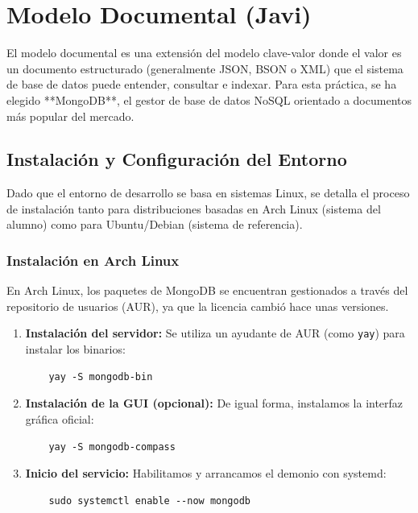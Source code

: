 \chapter{Modelo Documental (Javi)}

El modelo documental es una extensión del modelo clave-valor donde el valor es un documento estructurado (generalmente JSON, BSON o XML) que el sistema de base de datos puede entender, consultar e indexar. Para esta práctica, se ha elegido **MongoDB**, el gestor de base de datos NoSQL orientado a documentos más popular del mercado.

\section{Instalación y Configuración del Entorno}
Dado que el entorno de desarrollo se basa en sistemas Linux, se detalla el proceso de instalación tanto para distribuciones basadas en Arch Linux (sistema del alumno) como para Ubuntu/Debian (sistema de referencia).

\subsection{Instalación en Arch Linux}
En Arch Linux, los paquetes de MongoDB se encuentran gestionados a través del repositorio de usuarios (AUR), ya que la licencia cambió hace unas versiones.

\begin{enumerate}
    \item \textbf{Instalación del servidor:} Se utiliza un ayudante de AUR (como \texttt{yay}) para instalar los binarios:
    \begin{verbatim}
    yay -S mongodb-bin
    \end{verbatim}
    \item \textbf{Instalación de la GUI (opcional):} De igual forma, instalamos la interfaz gráfica oficial:
    \begin{verbatim}
    yay -S mongodb-compass
    \end{verbatim}
    \item \textbf{Inicio del servicio:} Habilitamos y arrancamos el demonio con systemd:
    \begin{verbatim}
    sudo systemctl enable --now mongodb
    \end{verbatim}
\end{enumerate}


